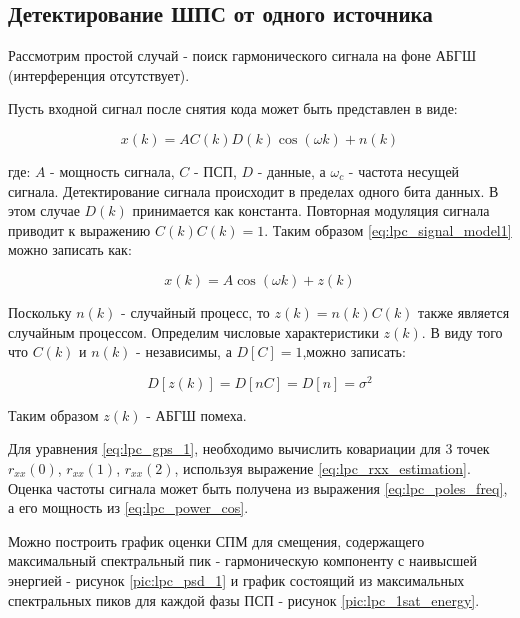 \subsection{Детектирование ШПС от одного источника}
Рассмотрим простой случай - поиск гармонического сигнала на фоне АБГШ (интерференция отсутствует).
\label{l:sec3_lpc}

Пусть входной сигнал после снятия кода может быть представлен в виде:
\begin{center}
\begin{equation}
	\label{eq:lpc_signal_model1}
	x(k) = AC(k)D(k)\cos(\omega k) + n(k)
\end{equation}
\end{center}
где: ${A}$ - мощность сигнала, ${C}$ - ПСП, ${D}$ - данные, а ${\omega_{c}}$ - частота несущей сигнала.
Детектирование сигнала происходит в пределах одного бита данных. В этом случае ${D(k)}$
принимается как константа. Повторная модуляция сигнала приводит к выражению ${C(k)C(k)=1}$.
Таким образом \ref{eq:lpc_signal_model1} можно записать как:
\begin{center}
\begin{equation}
	\label{eq:lpc_signal_model2}
	x(k)= A \cos{(\omega k)} + z(k)
\end{equation}
\end{center}

Поскольку ${n(k)}$ - случайный процесс, то ${z(k) = n(k)C(k)}$ также является
случайным процессом. Определим числовые характеристики ${z(k)}$.
В виду того что ${C(k)}$ и ${n(k)}$ - независимы, а ${D[C] = 1}$,можно записать:

\begin{center}
\begin{equation}
	D[z(k)] = D[nC] = D[n] = \sigma ^2
\end{equation}
\end{center}
Таким образом ${z(k)}$ - АБГШ помеха.

Для уравнения \ref{eq:lpc_gps_1}, необходимо вычислить ковариации для 3 точек
${r_{xx}(0)}$, ${r_{xx}(1)}$, ${r_{xx}(2)}$, используя выражение \ref{eq:lpc_rxx_estimation}.
Оценка частоты сигнала может быть получена из выражения \ref{eq:lpc_poles_freq}, а его
мощность из \ref{eq:lpc_power_cos}.

Можно построить график оценки СПМ для смещения,
содержащего максимальный спектральный пик - гармоническую компоненту
с наивысшей энергией - рисунок \ref{pic:lpc_psd_1} и график состоящий из максимальных спектральных пиков для каждой фазы
ПСП - рисунок \ref{pic:lpc_1sat_energy}.

